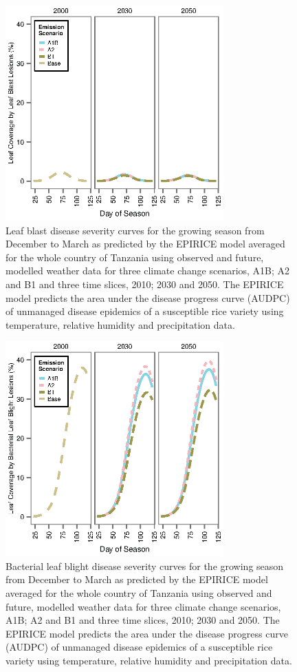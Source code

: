     \begin{figure}
      \includegraphics[width = 84mm]{figures/Fig2}
      \caption{Leaf blast disease severity curves for the growing season from December to March as predicted by the EPIRICE model averaged for the whole country of Tanzania using observed and future, modelled weather data for three climate change scenarios, A1B; A2 and B1 and three time slices, 2010; 2030 and 2050. The EPIRICE model predicts the area under the disease progress curve (AUDPC) of unmanaged disease epidemics of a susceptible rice variety using temperature, relative humidity and precipitation data.}
        \label{Fig2}
    \end{figure}
    
    \begin{figure}
      \includegraphics[width = 84mm]{figures/Fig3}
      \caption{Bacterial leaf blight disease severity curves for the growing season from December to March as predicted by the EPIRICE model averaged for the whole country of Tanzania using observed and future, modelled weather data for three climate change scenarios, A1B; A2 and B1 and three time slices, 2010; 2030 and 2050. The EPIRICE model predicts the area under the disease progress curve (AUDPC) of unmanaged disease epidemics of a susceptible rice variety using temperature, relative humidity and precipitation data.}
        \label{Fig3}
    \end{figure}
    
